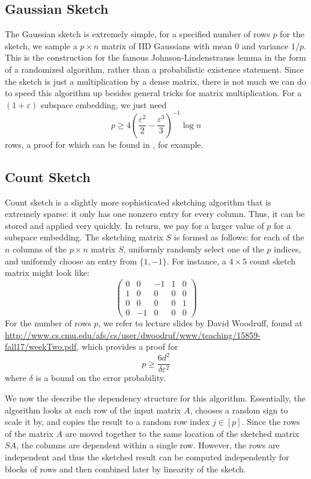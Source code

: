 \documentclass[12pt]{article}
\begin{document}
\subsection{Gaussian Sketch}
The Gaussian sketch is extremely simple, for a specified number of rows $p$ for the sketch, we sample a $p\times n$ matrix of IID Gaussians with mean $0$ and variance $1/p$. This is the construction for the famous Johnson-Lindenstrauss lemma in the form of a randomized algorithm, rather than a probabilistic existence statement. Since the sketch is just a multiplication by a dense matrix, there is not much we can do to speed this algorithm up besides general tricks for matrix multiplication. For a $(1+\varepsilon)$ subspace embedding, we just need
\[
	p\geq 4\left(\frac{\varepsilon^2}2-\frac{\varepsilon^3}3\right)^{-1}\log n
\]
rows, a proof for which can be found in \cite{dasgupta2003elementary}, for example.

\subsection{Count Sketch}
Count sketch is a slightly more sophisticated sketching algorithm that is extremely sparse: it only has one nonzero entry for every column. Thus, it can be stored and applied very quickly. In return, we pay for a larger value of $p$ for a subspace embedding. The sketching matrix $S$ is formed as follows: for each of the $n$ columns of the $p\times n$ matrix $S$, uniformly randomly select one of the $p$ indices, and uniformly choose an entry from $\{1,-1\}$. For instance, a $4\times 5$ count sketch matrix might look like:
\[
	\begin{pmatrix}
		0 & 0 & -1 & 1 & 0 \\
		1 & 0 & 0 & 0 & 0 \\
		0 & 0 & 0 & 0 & 1 \\
		0 & -1 & 0 & 0 & 0
	\end{pmatrix}
\]
For the number of rows $p$, we refer to lecture slides by David Woodruff, found at \url{http://www.cs.cmu.edu/afs/cs/user/dwoodruf/www/teaching/15859-fall17/weekTwo.pdf}, which provides a proof for
\[
	p\geq \frac{6d^2}{\delta\varepsilon^2}
\]
where $\delta$ is a bound on the error probability. 

We now the describe the dependency structure for this algorithm. Essentially, the algorithm looks at each row of the input matrix $A$, chooses a random sign to scale it by, and copies the result to a random row index $j\in[p]$. Since the rows of the matrix $A$ are moved together to the same location of the sketched matrix $SA$, the columns are dependent within a single row. However, the rows are independent and thus the sketched result can be computed independently for blocks of rows and then combined later by linearity of the sketch. 
\end{document}
